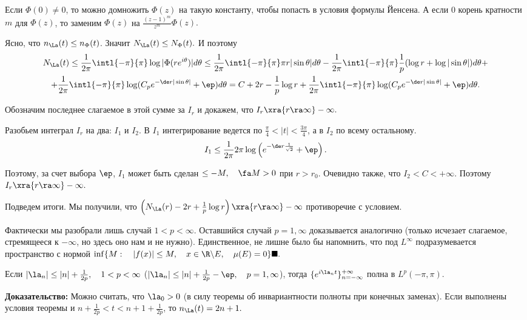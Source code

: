 \documentclass[a4paper]{article}
\begin{document}
Если $\Phi(0)\neq0$, то можно домножить $\Phi(z)$ на такую
константу, чтобы попасть в условия формулы Йенсена. А если $0$ корень кратности $m$ для $\Phi(z)$, то заменим $\Phi(z)$ на
$\frac{(z-1)^m}{z^m}\Phi(z).$

Ясно, что $n_{\La}(t)\le n_{\Phi}(t)$. Значит
$N_{\La}(t)\le N_{\Phi}(t).$ И поэтому
\begin{multline*}
N_{\La}(t)\le\frac1{2\pi}\intl{-\pi}{\pi}\log|\Phi(re^{i\theta})|d\theta\le
\frac1{2\pi}\intl{-\pi}{\pi}\pi
r|\sin\theta|d\theta-\frac1{2\pi}\intl{-\pi}{\pi}\frac1p(\log
r+\log|\sin\theta|)d\theta+\\
+\frac1{2\pi}\intl{-\pi}{\pi}\log(C_pe^{-\de
r|\sin\theta|}+\ep)d\theta=C+2r-\frac1p\log
r+\frac1{2\pi}\intl{-\pi}{\pi}\log(C_pe^{-\de
r|\sin\theta|}+\ep)d\theta.
\end{multline*}

Обозначим последнее слагаемое в этой сумме за $I_r$ и докажем, что
$I_r\xra{r\ra\infty} -\infty.$

Разобьем интеграл $I_r$ на два: $I_1$ и $I_2$. В $I_1$
интегрирование ведется по $\frac{\pi}4<|t|<\frac{3\pi}4$, а в
$I_2$ по всему остальному.
$$I_1\le\frac1{2\pi}2\pi\log\left(e^{-\de
r\frac1{\sqrt{2}}}+\ep\right).$$

Поэтому, за счет выбора $\ep$, $I_1$ может быть сделан
$\le-M,\quad\fa M>0$ при $r>r_0$. Очевидно также, что
$I_2<C<+\infty.$ Поэтому $I_r\xra{r\ra\infty}
-\infty.$

Подведем итоги. Мы получили, что $\left(N_{\La}(r)-2r+\frac1p
\log r\right)\xra{r\ra\infty}-\infty$ противоречие с условием.

Фактически мы разобрали лишь случай $1<p<\infty.$ Оставшийся
случай $p=1,\infty$ доказывается аналогично (только исчезает
слагаемое, стремящееся к $-\infty$, но здесь оно нам и не нужно).
Единственное, не лишне было бы напомнить, что под $L^{\infty}$
подразумевается пространство с нормой $\inf\{M:\quad|f(x)|\le
M,\quad x\in\R \backslash E,\quad\mu(E)=0\}\blacksquare.$

\begin{sled}
Если $|\la_n|\le|n|+\frac1{2p},\quad1<p<\infty$
($|\la_n|\le|n|+\frac1{2p}-\ep,\quad p=1,\infty$),
тогда $\{e^{i\la_n t}\}_{n=-\infty}^{+\infty}$ полна в
$L^p(-\pi,\pi).$
\end{sled}
\textbf{Доказательство:} Можно считать, что $\la_0>0$ (в силу
теоремы об инвариантности полноты при конечных заменах). Если
выполнены условия теоремы и $n+\frac1{2p}<t<n+1+\frac1{2p}$, то
$n_{\La}(t)=2n+1.$
\end{document}
